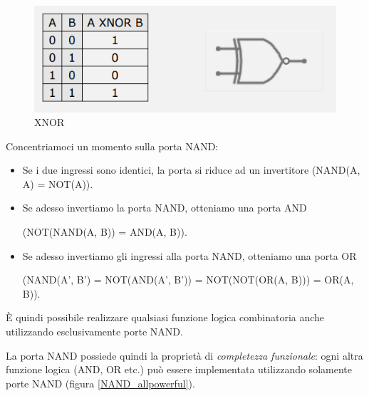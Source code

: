 \documentclass{article}
\begin{document}
\begin{figure}[h]
  \centering
  \includegraphics[scale=0.7]{IM_XNOR}
  \caption{XNOR}
  \label{XNOR}
\end{figure}

\clearpage

Concentriamoci un momento sulla porta NAND:

\vspace{1mm}

\begin{itemize}
  \item Se i due ingressi sono identici, la porta si riduce ad un invertitore (NAND(A, A) = NOT(A)).
  \item Se adesso invertiamo la porta NAND, otteniamo una porta AND 
  \begin{center}
    (NOT(NAND(A, B)) = AND(A, B)).
  \end{center}
  \item Se adesso invertiamo gli ingressi alla porta NAND, otteniamo una porta OR 
  \begin{center}
    (NAND(A', B') = NOT(AND(A', B')) = NOT(NOT(OR(A, B))) = OR(A, B)).
  \end{center}
\end{itemize}

È quindi possibile realizzare qualsiasi funzione logica combinatoria anche utilizzando esclusivamente porte NAND. 

\vspace{1mm}

La porta NAND possiede quindi la proprietà di \textit{completezza funzionale}: ogni altra funzione logica (AND, OR etc.) può essere implementata utilizzando solamente porte NAND (figura \ref{NAND_allpowerful}).
\end{document}
